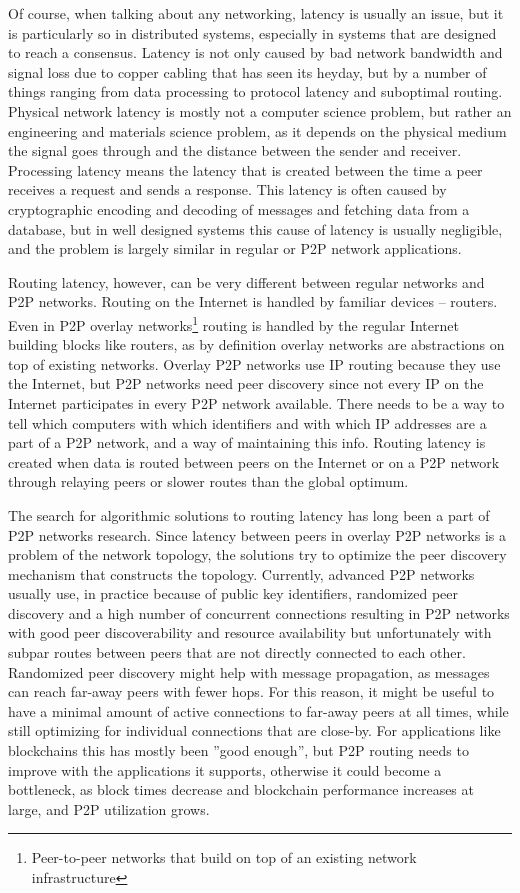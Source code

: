 Of course, when talking about any networking, latency is usually an issue, but it is particularly so in distributed systems, especially in systems that are designed to reach a consensus. Latency is not only caused by bad network bandwidth and signal loss due to copper cabling that has seen its heyday, but by a number of things ranging from data processing to protocol latency and suboptimal routing. Physical network latency is mostly not a computer science problem, but rather an engineering and materials science problem, as it depends on the physical medium the signal goes through and the distance between the sender and receiver. Processing latency means the latency that is created between the time a peer receives a request and sends a response. This latency is often caused by cryptographic encoding and decoding of messages and fetching data from a database, but in well designed systems this cause of latency is usually negligible, and the problem is largely similar in regular or P2P network applications.

Routing latency, however, can be very different between regular networks and P2P networks. Routing on the Internet is handled by familiar devices -- routers. Even in P2P overlay networks\footnote{Peer-to-peer networks that build on top of an existing network infrastructure} routing is handled by the regular Internet building blocks like routers, as by definition overlay networks are abstractions on top of existing networks. Overlay P2P networks use IP routing because they use the Internet, but P2P networks need peer discovery since not every IP on the Internet participates in every P2P network available. There needs to be a way to tell which computers with which identifiers and with which IP addresses are a part of a P2P network, and a way of maintaining this info. Routing latency is created when data is routed between peers on the Internet or on a P2P network through relaying peers or slower routes than the global optimum.

The search for algorithmic solutions to routing latency has long been a part of P2P networks research. Since latency between peers in overlay P2P networks is a problem of the network topology, the solutions try to optimize the peer discovery mechanism that constructs the topology. Currently, advanced P2P networks usually use, in practice because of public key identifiers, randomized peer discovery and a high number of concurrent connections resulting in P2P networks with good peer discoverability and resource availability but unfortunately with subpar routes between peers that are not directly connected to each other. Randomized peer discovery might help with message propagation, as messages can reach far-away peers with fewer hops. For this reason, it might be useful to have a minimal amount of active connections to far-away peers at all times, while still optimizing for individual connections that are close-by. For applications like blockchains this has mostly been ''good enough'', but P2P routing needs to improve with the applications it supports, otherwise it could become a bottleneck, as block times decrease and blockchain performance increases at large, and P2P utilization grows.

